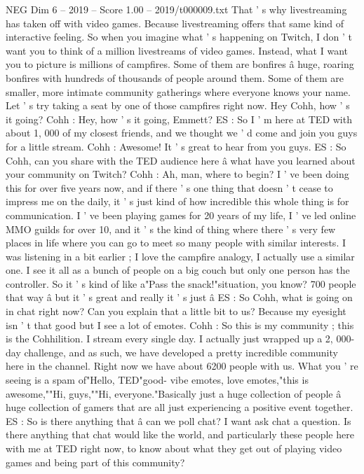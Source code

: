 \begin{textsample}{NEG Dim 6 – 2019 – Score 1.00 – 2019/t000009.txt}
That ' s why livestreaming has taken off with video games.
Because livestreaming offers that same kind of interactive feeling.
So when you imagine what ' s happening on Twitch, I don ' t want you to think of a million livestreams of video games.
Instead, what I want you to picture is millions of campfires.
Some of them are bonfires â huge, roaring bonfires with hundreds of thousands of people around them.
Some of them are smaller, more intimate community gatherings where everyone knows your name.
Let ' s try taking a seat by one of those campfires right now.
Hey Cohh, how ' s it going?
Cohh : Hey, how ' s it going, Emmett?
ES : So I ' m here at TED with about 1, 000 of my closest friends, and we thought we ' d come and join you guys for a little stream.
Cohh : Awesome!
It ' s great to hear from you guys.
ES : So Cohh, can you share with the TED audience here â what have you learned about your community on Twitch?
Cohh : Ah, man, where to begin?
I ' ve been doing this for over five years now, and if there ' s one thing that doesn ' t cease to impress me on the daily, it ' s just kind of how incredible this whole thing is for communication.
I ' ve been playing games for 20 years of my life, I ' ve led online MMO guilds for over 10, and it ' s the kind of thing where there ' s very few places in life where you can go to meet so many people with similar interests.
I was listening in a bit earlier ; I love the campfire analogy, I actually use a similar one.
I see it all as a bunch of people on a big couch but only one person has the controller.
So it ' s kind of like a"Pass the snack!"situation, you know? 700 people that way â but it ' s great and really it ' s just â ES : So Cohh, what is going on in chat right now?
Can you explain that a little bit to us?
Because my eyesight isn ' t that good but I see a lot of emotes.
Cohh : So this is my community ; this is the Cohhilition.
I stream every single day.
I actually just wrapped up a 2, 000-day challenge, and as such, we have developed a pretty incredible community here in the channel.
Right now we have about 6200 people with us.
What you ' re seeing is a spam of"Hello, TED"good- vibe emotes, love emotes,"this is awesome,""Hi, guys,""Hi, everyone."Basically just a huge collection of people â huge collection of gamers that are all just experiencing a positive event together.
ES : So is there anything that â can we poll chat?
I want ask chat a question.
Is there anything that chat would like the world, and particularly these people here with me at TED right now, to know about what they get out of playing video games and being part of this community?

\end{textsample}
